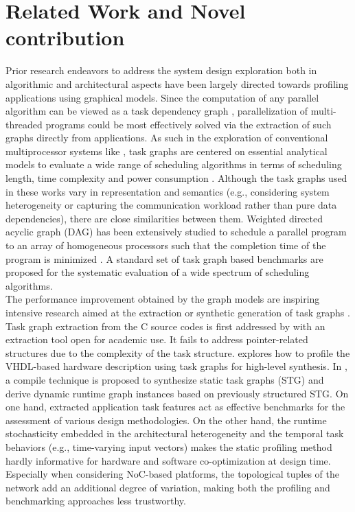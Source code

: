 \section{Related Work and Novel contribution}
Prior research endeavors to address the system design exploration both in algorithmic and architectural aspects have been largely directed towards profiling applications using graphical models. Since the computation of any parallel algorithm can be viewed as a task dependency graph \cite{kumar1994introduction}, parallelization of multi-threaded programs could be most effectively solved via the extraction of such graphs directly from applications. As such in the exploration of conventional multiprocessor systems like \cite{kwok1999benchmarking}\cite{Pruhs03onlinescheduling}\cite{agrawal2010executing},  task graphs are centered on essential analytical models to evaluate a wide range of scheduling algorithms in terms of  scheduling length, time complexity and power consumption \cite{cong2012energy}. Although the task graphs used in these works vary in representation and semantics (e.g., considering system heterogeneity or capturing the communication workload rather than pure data dependencies), there are close similarities between them.  Weighted directed acyclic graph (DAG) has been extensively studied to schedule a parallel program to an array of homogeneous processors such that the completion time of the program is minimized \cite{kwok1999benchmarking}. A standard set of task graph based benchmarks are proposed for the systematic evaluation of a wide spectrum of scheduling algorithms. \\
\indent The performance improvement obtained by the graph models are inspiring intensive research aimed at the extraction or synthetic generation of task graphs \cite{kempf2006sw}\cite{advea2001compiler}\cite{vallerio2003task_ccode}\cite{ganeshpure2010run}\cite{namballa2004control}\cite{dick1998tgff}. Task graph extraction from the C source codes is first addressed by \cite{vallerio2003task_ccode} with an extraction tool open for academic use. It fails to address pointer-related structures due to the complexity of the task structure. \cite{namballa2004control} explores how to profile the VHDL-based hardware description using task graphs for high-level synthesis. In \cite{advea2001compiler}, a compile technique is proposed to synthesize static task graphs (STG) and derive dynamic runtime graph instances based on previously structured STG. On one hand, extracted application task features act as effective benchmarks for the assessment of various design methodologies. On the other hand, the runtime stochasticity embedded in the architectural heterogeneity and the temporal task behaviors (e.g., time-varying input vectors) makes the static profiling method hardly informative for hardware and software co-optimization at design time.  Especially when considering NoC-based platforms, the topological tuples of the network add an additional degree of variation, making both the profiling and benchmarking approaches less trustworthy.\\
